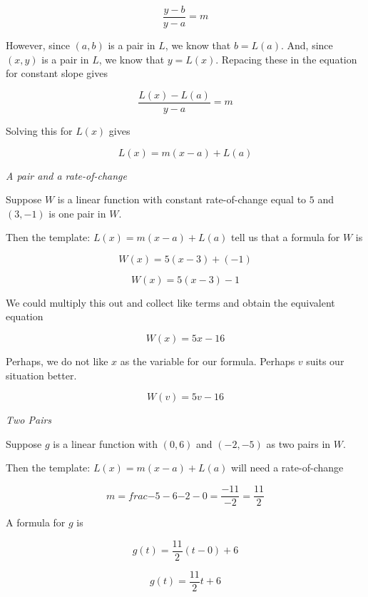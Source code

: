 \documentclass{ximera}
\begin{document}
\[  \frac{y - b}{y-a} = m \]

However, since $(a, b)$ is a pair in $L$, we know that $b = L(a)$.  And, since $(x, y)$ is a pair in $L$, we know that $y = L(x)$.  Repacing these in the equation for constant slope gives


\[  \frac{L(x) - L(a)}{y-a} = m \]

Solving this for $L(x)$ gives

\[  L(x) = m (x-a) + L(a)     \]








\begin{example} \textit{A pair and a rate-of-change}


Suppose $W$ is a linear function with constant rate-of-change equal to $5$ and $(3, -1)$ is one pair in $W$.

Then the template: $L(x) = m (x-a) + L(a)$ tell us that a formula for $W$ is 


\[  W(x) = 5 (x-3) + (-1)     \]


\[  W(x) = 5 (x-3) - 1     \]

We could multiply this out and collect like terms and obtain the equivalent equation


\[  W(x) = 5x - 16   \]


Perhaps, we do not like $x$ as the variable for our formula.  Perhaps $v$ suits our situation better.

\[  W(v) = 5v - 16   \]

\end{example}









\begin{example} \textit{Two Pairs}


Suppose $g$ is a linear function with $(0, 6)$ and $(-2, -5)$ as two pairs in $W$.

Then the template: $L(x) = m (x-a) + L(a)$ will need a rate-of-change



\[  m = frac{-5 - 6}{-2 - 0} = \frac{-11}{-2} = \frac{11}{2}  \]

A formula for $g$ is


\[  g(t) = \frac{11}{2} (t-0) + 6     \]


\[  g(t) = \frac{11}{2} t + 6    \]



\end{example}
\end{document}
